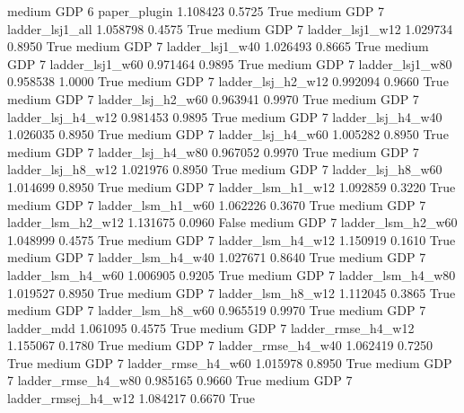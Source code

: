     medium      GDP                 6        paper_plugin   1.108423      0.5725    True
    medium      GDP                 7     ladder_lsj1_all   1.058798      0.4575    True
    medium      GDP                 7     ladder_lsj1_w12   1.029734      0.8950    True
    medium      GDP                 7     ladder_lsj1_w40   1.026493      0.8665    True
    medium      GDP                 7     ladder_lsj1_w60   0.971464      0.9895    True
    medium      GDP                 7     ladder_lsj1_w80   0.958538      1.0000    True
    medium      GDP                 7   ladder_lsj_h2_w12   0.992094      0.9660    True
    medium      GDP                 7   ladder_lsj_h2_w60   0.963941      0.9970    True
    medium      GDP                 7   ladder_lsj_h4_w12   0.981453      0.9895    True
    medium      GDP                 7   ladder_lsj_h4_w40   1.026035      0.8950    True
    medium      GDP                 7   ladder_lsj_h4_w60   1.005282      0.8950    True
    medium      GDP                 7   ladder_lsj_h4_w80   0.967052      0.9970    True
    medium      GDP                 7   ladder_lsj_h8_w12   1.021976      0.8950    True
    medium      GDP                 7   ladder_lsj_h8_w60   1.014699      0.8950    True
    medium      GDP                 7   ladder_lsm_h1_w12   1.092859      0.3220    True
    medium      GDP                 7   ladder_lsm_h1_w60   1.062226      0.3670    True
    medium      GDP                 7   ladder_lsm_h2_w12   1.131675      0.0960   False
    medium      GDP                 7   ladder_lsm_h2_w60   1.048999      0.4575    True
    medium      GDP                 7   ladder_lsm_h4_w12   1.150919      0.1610    True
    medium      GDP                 7   ladder_lsm_h4_w40   1.027671      0.8640    True
    medium      GDP                 7   ladder_lsm_h4_w60   1.006905      0.9205    True
    medium      GDP                 7   ladder_lsm_h4_w80   1.019527      0.8950    True
    medium      GDP                 7   ladder_lsm_h8_w12   1.112045      0.3865    True
    medium      GDP                 7   ladder_lsm_h8_w60   0.965519      0.9970    True
    medium      GDP                 7          ladder_mdd   1.061095      0.4575    True
    medium      GDP                 7  ladder_rmse_h4_w12   1.155067      0.1780    True
    medium      GDP                 7  ladder_rmse_h4_w40   1.062419      0.7250    True
    medium      GDP                 7  ladder_rmse_h4_w60   1.015978      0.8950    True
    medium      GDP                 7  ladder_rmse_h4_w80   0.985165      0.9660    True
    medium      GDP                 7 ladder_rmsej_h4_w12   1.084217      0.6670    True
